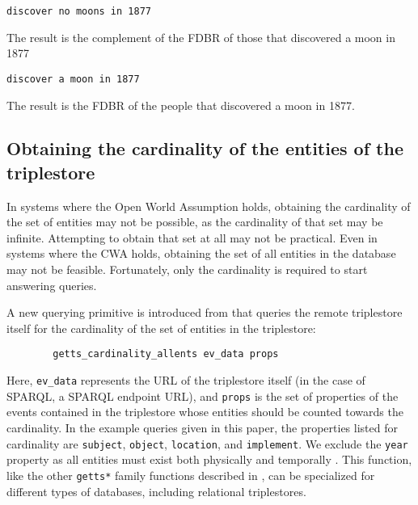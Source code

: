 \documentclass[../main.tex]{subfiles}
\begin{document}
\begin{refsection}
\examplespacing

\texttt{discover no moons in 1877}

\examplespacing

\noindent The result is the complement of the FDBR of those that discovered a moon in 1877

\examplespacing

\texttt{discover a moon in 1877}

\examplespacing

\noindent The result is the FDBR of the people that discovered a moon in 1877.

\subsection{Obtaining the cardinality of the entities of the triplestore}

In systems where the Open World Assumption holds, obtaining the cardinality of the set of entities
may not be possible, as the cardinality of that set may be infinite.  Attempting to obtain that set at all may not be practical.  Even in systems where the CWA holds, obtaining the set of all entities in the database may not be feasible.  Fortunately, only the cardinality is required to start answering queries.

A new querying primitive is introduced from \cite{peelar2020webistjournal} that queries the remote triplestore itself for the cardinality of the set of entities in the triplestore:

\begin{verbatim}
        getts_cardinality_allents ev_data props
\end{verbatim}

Here, \texttt{ev\_data} represents the URL of the triplestore itself (in the case of SPARQL, a SPARQL endpoint URL), and \texttt{props} is the set of properties of the events contained in the triplestore whose entities should be counted towards the cardinality.  In the example queries given in this paper, the properties listed for cardinality are \texttt{subject}, \texttt{object}, \texttt{location}, and \texttt{implement}.  We exclude the \texttt{year} property as all entities must exist both physically and temporally \cite{w3csemanticweb}.  This function, like the other  \texttt{getts*} family functions described in \cite{frostpeelar2019}, can be specialized for different types of databases, including relational triplestores.


\end{refsection}
\end{document}
